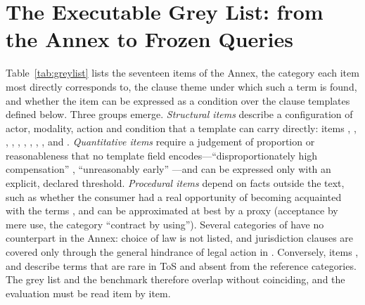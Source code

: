 \section{The Executable Grey List: from the Annex to Frozen Queries}
\label{sec:greylist}
\label{sec:queries}
Table~\ref{tab:greylist} lists the seventeen items of the Annex, the \corpus{} category each item most directly corresponds to, the clause theme under which such a term is found, and whether the item can be expressed as a condition over the clause templates defined below. Three groups emerge. \emph{Structural items} describe a configuration of actor, modality, action and condition that a template can carry directly: items , , , , , , , , ,  and . \emph{Quantitative items} require a judgement of proportion or reasonableness that no template field encodes---``disproportionately high compensation'' , ``unreasonably early'' ---and can be expressed only with an explicit, declared threshold. \emph{Procedural items} depend on facts outside the text, such as whether the consumer had a real opportunity of becoming acquainted with the terms , and can be approximated at best by a proxy (acceptance by mere use, the \corpus{} category ``contract by using''). Several categories of \corpus{} have no counterpart in the Annex: choice of law is not listed, and jurisdiction clauses are covered only through the general hindrance of legal action in . Conversely, items ,  and  describe terms that are rare in ToS and absent from the reference categories. The grey list and the benchmark therefore overlap without coinciding, and the evaluation must be read item by item.

